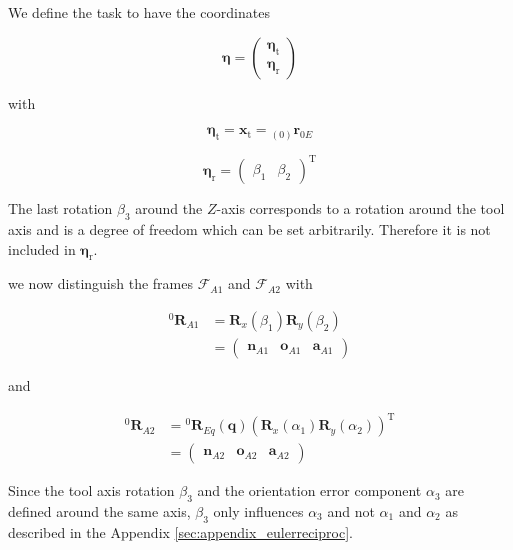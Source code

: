 \documentclass[twocolumn,10pt]{IFTOMM}
\newcommand{\bm}[1]{\boldsymbol{#1}}
\newcommand{\ortvek}[4]{{ }_{(#1)}{\boldsymbol{#2}}^{#3}_{#4} }
\newcommand{\vek}[3]{\boldsymbol{#1}^{#2}_{#3}}
\newcommand{\rotmat}[2]{{{ }^{#1}\boldsymbol{R}}_{#2}}
\newcommand{\transp}[0]{{\mathrm{T}}}
\newcommand{\ks}[1]{{\mathcal{F}}_{#1}}
\begin{document}
We define the task to have the coordinates

\begin{equation}
\bm{\eta}
=
\begin{pmatrix}
\bm{\eta}_{\mathrm{t}} \\
\bm{\eta}_{\mathrm{r}}
\end{pmatrix}
\end{equation}  

with

\begin{equation}
\bm{\eta}_{\mathrm{t}}
=
\bm{x}_{\mathrm{t}}
=
\ortvek{0}{r}{}{0E}
\end{equation}  

\begin{equation}
\bm{\eta}_{\mathrm{r}}
=
\begin{pmatrix}
\beta_1  & \beta_2
\end{pmatrix}^\transp
\end{equation}

The last rotation $\beta_3$ around the $Z$-axis corresponds to a rotation around the tool axis and is a degree of freedom which can be set arbitrarily. Therefore it is not included in $\bm{\eta}_{\mathrm{r}}$.


we now distinguish the frames $\ks{A1}$ and $\ks{A2}$ with


\begin{align}
\rotmat{0}{A1} 
&= 
\bm{R}_x(\beta_1) \bm{R}_y(\beta_2)\\
&=
\begin{pmatrix}
\vek{n}{}{A1} & \vek{o}{}{A1} & \vek{a}{}{A1}
\end{pmatrix} \nonumber
\end{align}


and

\begin{align}
\rotmat{0}{A2} 
&= 
\rotmat{0}{Eq}(\bm{q})
\left(\bm{R}_x(\alpha_1) \bm{R}_y(\alpha_2)\right)^\transp \\ 
&=
\begin{pmatrix}
\vek{n}{}{A2} & \vek{o}{}{A2} & \vek{a}{}{A2}
\end{pmatrix}\nonumber
\end{align}

Since the tool axis rotation $\beta_3$ and the orientation error component $\alpha_3$ are defined around the same axis, $\beta_3$ only influences $\alpha_3$ and not $\alpha_1$ and $\alpha_2$ as described in the Appendix \ref{sec:appendix_eulerreciproc}.
\end{document}
